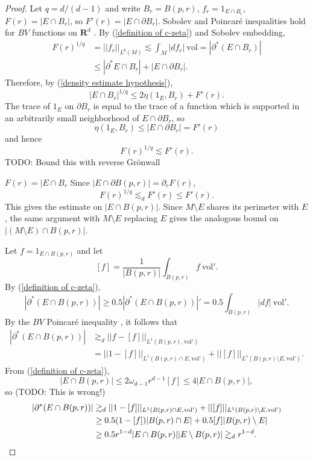 \documentclass[reqno,12pt,letterpaper]{amsart}
\newcommand{\RR}{\mathbf{R}}
\newcommand{\vol}{\mathrm{vol}}
\theoremstyle{definition}
\numberwithin{equation}{section}
\begin{document}
\begin{proof}
Let $q = d/(d-1)$ and write $B_r = B(p, r)$, $f_r = 1_{E \cap B_r}$, $F(r) = |E \cap B_r|$, so $F'(r) = |E \cap \partial B_r|$.
Sobolev and Poincar\'e inequalities hold for $BV$ functions on $\RR^d$ \cite[\S5.6.1]{evans1991measure}.
By (\ref{definition of c-zeta}) and Sobolev embedding,
\begin{align*}
F(r)^{1/q} &= ||f_r||_{L^q(M)} \lesssim \int_M |df_r| ~\vol = |\partial^*(E \cap B_r)|\\
&\leq |\partial^* E \cap B_r| + |E \cap \partial B_r|.
\end{align*}
Therefore, by (\ref{density estimate hypothesis}),
$$|E \cap B_r|^{1/q} \leq 2\eta(1_E, B_r) + F'(r).$$
The trace of $1_E$ on $\partial B_r$ is equal to the trace of a function which is supported in an arbitrarily small neighborhood of $E \cap \partial B_r$, so
$$\eta(1_E, B_r) \leq |E \cap \partial B_r| = F'(r)$$
and hence
$$F(r)^{1/q} \lesssim F'(r).$$
TODO: Bound this with reverse Gr\"onwall

$F(r) = |E \cap B_r$
Since $|E \cap \partial B(p, r)| = \partial_r F(r)$,
$$F(r)^{1/q} \lesssim_d F'(r) \leq F'(r).$$
This gives the estimate on $|E \cap B(p, r)|$.
Since $M \setminus E$ shares its perimeter with $E$, the same argument with $M \setminus E$ replacing $E$ gives the analogous bound on $|(M \setminus E) \cap B(p, r)|$.

Let $f = 1_{E \cap B(p, r)}$ and let
$$[f] = \frac{1}{|B(p, r)|} \int_{B(p, r)} f ~\vol'.$$
By (\ref{definition of c-zeta}),
$$|\partial^* (E \cap B(p, r))| \geq 0.5 |\partial^* (E \cap B(p, r))|' = 0.5 \int_{B(p, r)} |df| ~\vol'.$$
By the $BV$ Poincar\'e inequality \cite[\S5.6.1]{evans1991measure}, it follows that
\begin{align*}
|\partial^* (E \cap B(p, r))| &\gtrsim_d ||f - [f]||_{L^1(B(p, r), \vol')} \\
&= ||1 - [f]||_{L^1(B(p, r) \cap E, \vol')} + ||[f]||_{L^1(B(p, r) \setminus E, \vol')}.
\end{align*}
From (\ref{definition of c-zeta}),
$$|E \cap B(p, r)| \leq 2\omega_{d - 1} r^{d - 1} [f] \leq 4|E \cap B(p, r)|,$$
so (TODO: This is wrong!)
\begin{align*}
|\partial^* (E \cap B(p, r))| &\gtrsim_d ||1 - [f]||_{L^1(B(p, r) \cap E, \vol')} + ||[f]||_{L^1(B(p, r) \setminus E, \vol')}\\
&\geq 0.5 (1 - [f]) |B(p, r) \cap E| + 0.5 [f] |B(p, r) \setminus E|\\
&\geq 0.5 r^{1-d}|E \cap B(p, r)||E \setminus B(p, r)| \gtrsim_d r^{1 - d}. \qedhere
\end{align*}
\end{proof}
\end{document}
